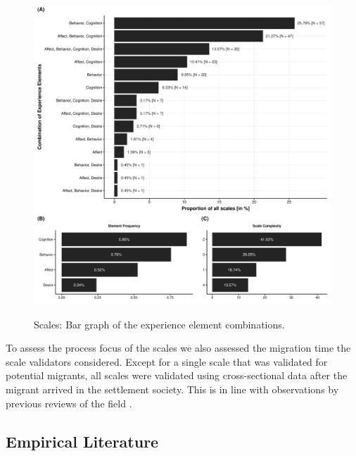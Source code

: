 \begin{figure}[h]
\centering
\caption{Scales: Bar graph of the experience element combinations.}
\includegraphics[width=\textwidth]{Figures/ABCDFreq-1}
\label{fig:ElementsScales}
\end{figure}



To assess the process focus of the scales we also assessed the migration
time the scale validators considered. Except for a single scale that was
validated for potential migrants, all scales were validated using
cross-sectional data after the migrant arrived in the settlement
society. This is in line with observations by previous reviews of the
field \citep[e.g.,][]{Brown2011}.

\subsection{Empirical Literature}

